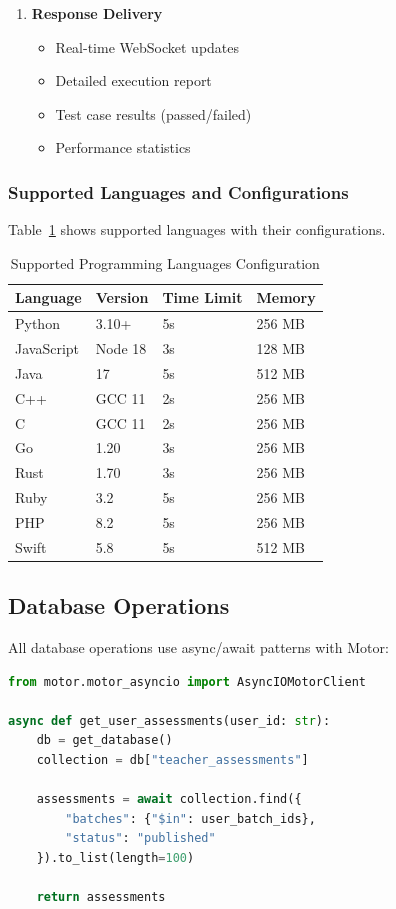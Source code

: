 \documentclass[conference]{IEEEtran}
\begin{document}
\begin{enumerate}
    \item \textbf{Response Delivery}
    \begin{itemize}
        \item Real-time WebSocket updates
        \item Detailed execution report
        \item Test case results (passed/failed)
        \item Performance statistics
    \end{itemize}
\end{enumerate}

\subsubsection{Supported Languages and Configurations}
Table~\ref{tab:languages} shows supported languages with their configurations.

\begin{table}[ht]
    \centering
    \caption{Supported Programming Languages Configuration}
    \label{tab:languages}
    \begin{tabular}{@{}llll@{}}
        \toprule
        \textbf{Language} & \textbf{Version} & \textbf{Time Limit} & \textbf{Memory} \\
        \midrule
        Python & 3.10+ & 5s & 256 MB \\
        JavaScript & Node 18 & 3s & 128 MB \\
        Java & 17 & 5s & 512 MB \\
        C++ & GCC 11 & 2s & 256 MB \\
        C & GCC 11 & 2s & 256 MB \\
        Go & 1.20 & 3s & 256 MB \\
        Rust & 1.70 & 3s & 256 MB \\
        Ruby & 3.2 & 5s & 256 MB \\
        PHP & 8.2 & 5s & 256 MB \\
        Swift & 5.8 & 5s & 512 MB \\
        \bottomrule
    \end{tabular}
\end{table}

\subsection{Database Operations}
All database operations use async/await patterns with Motor:

\begin{lstlisting}[language=Python, caption=Async Database Query]
from motor.motor_asyncio import AsyncIOMotorClient

async def get_user_assessments(user_id: str):
    db = get_database()
    collection = db["teacher_assessments"]
    
    assessments = await collection.find({
        "batches": {"$in": user_batch_ids},
        "status": "published"
    }).to_list(length=100)
    
    return assessments
\end{lstlisting}
\end{document}
